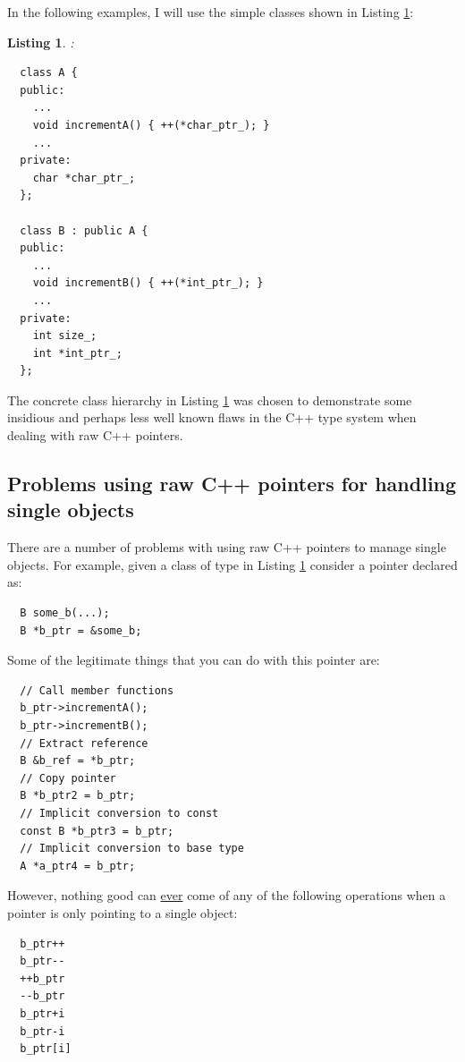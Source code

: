 \documentclass[pdf,ps2pdf,11pt]{SANDreport}
\newtheorem{listing}{Listing}
\begin{document}
In the following examples, I will use the simple classes shown in
Listing {}\ref{listing:Simple_A_B}:

\begin{listing}:\\
\label{listing:Simple_A_B}
{\small\begin{verbatim}
  class A {
  public:
    ...
    void incrementA() { ++(*char_ptr_); }
    ...
  private:
    char *char_ptr_;
  };

  class B : public A {
  public:
    ...
    void incrementB() { ++(*int_ptr_); }
    ...
  private:
    int size_;
    int *int_ptr_;
  };
\end{verbatim}}
\end{listing}

The concrete class hierarchy in Listing {}\ref{listing:Simple_A_B} was
chosen to demonstrate some insidious and perhaps less well known flaws
in the C++ type system when dealing with raw C++ pointers.


%
{}\subsection{Problems using raw C++ pointers for handling single objects}
%

There are a number of problems with using raw C++ pointers to manage
single objects.  For example, given a class of type {} in
Listing {}\ref{listing:Simple_A_B} consider a pointer declared as:

{\small\begin{verbatim}
  B some_b(...);
  B *b_ptr = &some_b;
\end{verbatim}}

Some of the legitimate things that you can do with this pointer are:

{\small\begin{verbatim}
  // Call member functions
  b_ptr->incrementA();
  b_ptr->incrementB();
  // Extract reference
  B &b_ref = *b_ptr;
  // Copy pointer
  B *b_ptr2 = b_ptr;
  // Implicit conversion to const
  const B *b_ptr3 = b_ptr;
  // Implicit conversion to base type
  A *a_ptr4 = b_ptr;
\end{verbatim}}

However, nothing good can {}\underline{ever} come of any of the
following operations when a pointer is only pointing to a single
object:

{\small\begin{verbatim}
  b_ptr++
  b_ptr--
  ++b_ptr
  --b_ptr
  b_ptr+i
  b_ptr-i
  b_ptr[i]
\end{verbatim}}
\end{document}
